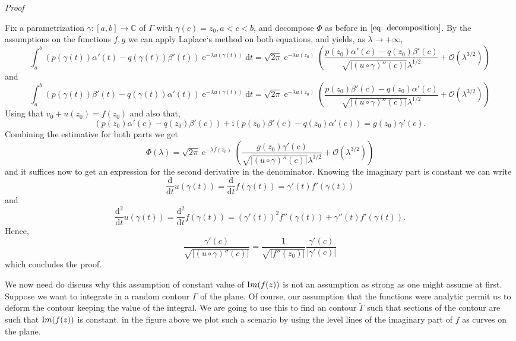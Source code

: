 \documentclass[]{report}
\makeatletter
\renewcommand{\Im}{\mathop{\textrm Im}}
\DeclareMathOperator{\ee}{e}
\newcommand{\C}{\mathbb{C}}
\newcommand{\Boh}{\mathcal{O}}
\newcommand{\ii}{\mathrm{i}}
\newcommand{\dd}{\mathrm{d}}
\numberwithin{equation}{section} %
\newenvironment{Mproof}[1][Proof]{\par
	\pushQED{\qed}%
	\normalfont \topsep6\p@\@plus6\p@\relax
	\trivlist
	\item\relax
	{\itshape
		#1\@addpunct{.}}\hspace\labelsep\ignorespaces
}{%
	\popQED\endtrivlist\@endpefalse
}
\makeatother
\begin{document}
\begin{Mproof}
		Fix a parametrization $\gamma : [a,b] \rightarrow \C$ of $\Gamma$ with $\gamma(c) = z_0, a < c < b$, and decompose $\Phi$ as before in $\ref{eq: decomposition}$. By the assumptions on the functions $f, g$ we can apply Laplace`s method on both equations, and yields, as $\lambda \rightarrow + \infty$,
		$$\int_{a}^{b} (p(\gamma(t))\alpha'(t)-q(\gamma(t))\beta'(t)) \ee^{-\lambda u(\gamma(t))} \dd t = \sqrt{2\pi} \ee^{-\lambda u(z_0)} \left( \frac{p(z_0)\alpha'(c)-q(z_0)\beta'(c)}{\sqrt{|(u \circ \gamma)''(c)|} \lambda^{1/2}} + \Boh \left(\lambda^{3/2}\right) \right)$$
		and
		$$\int_{a}^{b} (p(\gamma(t))\beta'(t)-q(\gamma(t))\alpha'(t)) \ee^{-\lambda u(\gamma(t))} \dd t = \sqrt{2\pi} \ee^{-\lambda u(z_0)} \left( \frac{p(z_0)\beta'(c)-q(z_0)\alpha'(c)}{\sqrt{|(u \circ \gamma)''(c)|} \lambda^{1/2}} + \Boh \left(\lambda^{3/2}\right) \right)$$
		Using that $v_0 + u(z_0) = f(z_0)$ and also that,
		$$ (p(z_0)\alpha'(c)-q(z_0)\beta'(c)) + \ii (p(z_0)\beta'(c)-q(z_0)\alpha'(c)) = g(z_0)\gamma'(c).$$
		Combining the estimative for both parts we get
		$$\Phi(\lambda) = \sqrt{2\pi} \ee^{-\lambda f(z_0)} \left( \frac{g(z_0)\gamma'(c)}{\sqrt{|(u \circ \gamma)''(c)|} \lambda^{1/2}} + \Boh \left(\lambda^{3/2}\right) \right)$$ 
		and it suffices now to get an expression for the second derivative in the denominator. Knowing the imaginary part is constant we can write
		$$\frac{\dd}{\dd t} u(\gamma(t)) = \frac{\dd}{\dd t} f(\gamma(t)) = \gamma'(t) f'(\gamma(t))$$
		and
		$$ \frac{\dd^2}{\dd t} u(\gamma(t)) = \frac{\dd^2}{\dd t} f(\gamma(t)) = (\gamma'(t))^2 f''(\gamma(t)) + \gamma''(t) f'(\gamma(t)).$$
		Hence,
		$$ \frac{\gamma'(c)}{\sqrt{|(u \circ \gamma)''(c)|}} = \frac{1}{\sqrt{|f''(z_0)|}} \frac{\gamma'(c)}{|\gamma'(c)|}$$
		which concludes the proof.
\end{Mproof}

We now need do discuss why this assumption of constant value of $\Im(f(z))$ is not an assumption as strong as one might assume at first. Suppose we want to integrate in a random contour $\Gamma$ of the plane. Of course, our assumption that the functions were analytic permit us to deform the contour keeping the value of the integral. We are going to use this to find an contour $\tilde{\Gamma}$ such that sections of the contour are such that $\Im(f(z))$ is constant. in the figure above we plot such a scenario by using the level lines of the imaginary part of $f$ as curves on the plane. 
\end{document}

